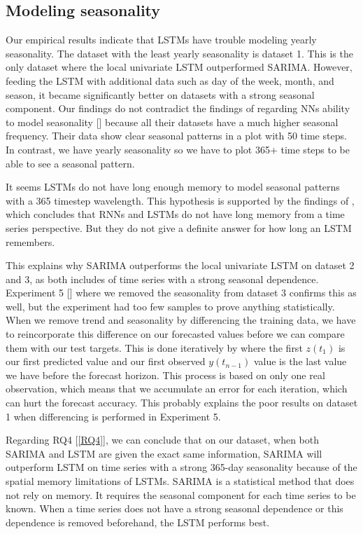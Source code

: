 
\subsection{Modeling seasonality}
Our empirical results indicate that LSTMs have trouble modeling yearly seasonality.
The dataset with the least yearly seasonality is dataset 1. This is the only dataset where
the local univariate LSTM outperformed SARIMA. However, feeding the LSTM with additional
data such as day of the week, month, and season, it became significantly better on datasets
with a strong seasonal component.
Our findings do not contradict the findings of \cite{Hewamalage2021} regarding NNs ability
to model seasonality []
because all their datasets have a much higher seasonal frequency. Their
data show clear seasonal patterns in a plot with 50 time steps. In contrast, we have yearly seasonality
so we have to plot 365+ time steps to be able to see a seasonal pattern.

It seems LSTMs do not have long enough memory to model seasonal patterns
with a 365 timestep wavelength.
This hypothesis is supported by the findings of \cite{Zhao2020}, which concludes that
RNNs and LSTMs do not have long memory from a time series perspective.
But they do not give a definite answer for how long an LSTM remembers.

This explains why SARIMA outperforms the local univariate LSTM on dataset 2 and 3, as both includes
of time series with a strong seasonal dependence.
Experiment 5 [] where we removed
the seasonality from dataset 3 confirms this as well, but the experiment had too few samples
to prove anything statistically. When we remove trend and seasonality by differencing the training data,
we have to reincorporate this difference on our forecasted values before we can compare them with our
test targets. This is done iteratively by  where the first
$z(t_1)$ is our first predicted value and our first observed $y(t_{n-1})$ value is the last value
we have before the forecast horizon. This process is based on only one real observation, which means
that we accumulate an error for each iteration, which can hurt the forecast accuracy.
This probably explains the poor results on dataset 1 when differencing is performed in Experiment 5.

Regarding RQ4 [\ref{RQ4}], we can conclude that on our dataset, when
both SARIMA and LSTM are given the exact same information, SARIMA will outperform
LSTM on time series with a strong 365-day seasonality because of the spatial memory limitations
of LSTMs.
SARIMA is a statistical method that does not rely on memory.
It requires the seasonal component for each time series to be known.
When a time series does not have a strong seasonal dependence or this
dependence is removed beforehand, the LSTM performs best.

